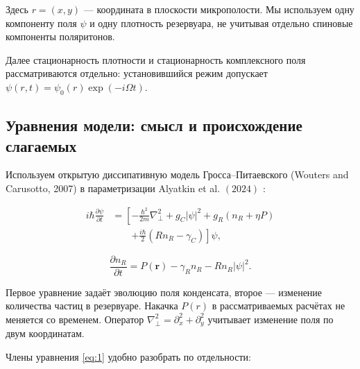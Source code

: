 \documentclass[12pt,a4paper]{article}
\begin{document}
Здесь $r=(x,y)$ --- координата в плоскости микрополости. Мы используем одну компоненту поля $\psi$ и одну плотность резервуара, не учитывая отдельно спиновые компоненты поляритонов.

Далее стационарность плотности и стационарность комплексного поля рассматриваются отдельно: установившийся режим допускает $\psi(r,t)=\psi_{0}(r)\exp(-i \Omega t)$.

\subsection{Уравнения модели: смысл и происхождение слагаемых}\label{sec:2.2}

Используем открытую диссипативную модель Гросса--Питаевского (\foreignlanguage{english}{Wouters and Carusotto, 2007}) \cite{ref1} в параметризации Alyatkin et al. $(2024)$ \cite{ref3}:

\begin{equation}\label{eq:1}
\begin{aligned}
i\hbar\frac{\partial\psi}{\partial t}
&=\left[-\frac{\hbar^2}{2m}\nabla_\perp^2
+g_C|\psi|^2+g_R(n_R+\eta P)\right.\\
&\qquad\left.+\frac{i\hbar}{2}(Rn_R-\gamma_C)\right]\psi ,
\end{aligned}\end{equation}

\begin{equation}\label{eq:2}
\frac{\partial n_R}{\partial t}=P(\mathbf r)-\gamma_R n_R-Rn_R|\psi|^2.\end{equation}

Первое уравнение задаёт эволюцию поля конденсата, второе --- изменение количества частиц в резервуаре. Накачка $P(r)$ в рассматриваемых расчётах не меняется со временем. Оператор $\nabla_{\perp}^{2}=\partial_{x}^{2}+\partial_{y}^{2}$ учитывает изменение поля по двум координатам.

Члены уравнения \eqref{eq:1} удобно разобрать по отдельности:
\end{document}

